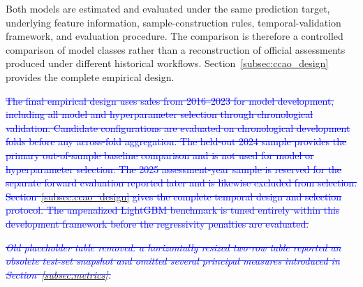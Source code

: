 \documentclass[10pt]{article}
\theoremstyle{definition}
\newcommand{\1}{\mathbf{1}}
\begin{document}
{\textcolor{impGreen}{
Both models are estimated and evaluated under the same prediction target,
underlying feature information, sample-construction rules, temporal-validation
framework, and evaluation procedure. The comparison is therefore a controlled
comparison of model classes rather than a reconstruction of official
assessments produced under different historical workflows.
Section~\ref{subsec:ccao_design} provides the complete empirical design.
}

\textcolor{blue}{\sout{The final empirical design uses sales from 2016--2023 for model development, including all model and hyperparameter selection through chronological validation. Candidate configurations are evaluated on chronological development folds before any across-fold aggregation. The held-out 2024 sample provides the primary out-of-sample baseline comparison and is not used for model or hyperparameter selection. The 2025 assessment-year sample is reserved for the separate forward evaluation reported later and is likewise excluded from selection. Section~\ref{subsec:ccao_design} gives the complete temporal design and selection protocol. The unpenalized LightGBM benchmark is tuned entirely within this development framework before the regressivity penalties are evaluated.}}

\textcolor{impGreen}{
}




\textcolor{blue}{\sout{\textit{Old placeholder table removed: a horizontally resized two-row table reported an obsolete test-set snapshot and omitted several principal measures introduced in Section~\ref{subsec:metrics}.}}}

}
\end{document}
